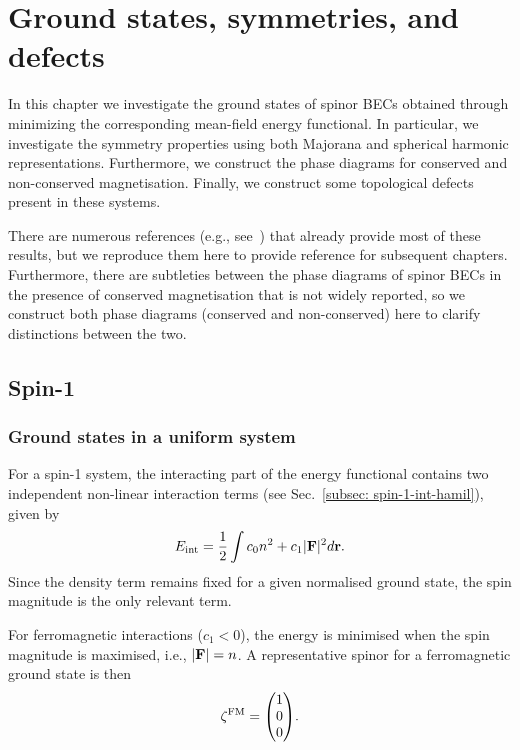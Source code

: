 \chapter{Ground states, symmetries, and defects}\label{chap: ground-states}
In this chapter we investigate the ground states of spinor BECs obtained through
minimizing the corresponding mean-field energy functional.
In particular, we investigate the symmetry properties using both Majorana and
spherical harmonic representations.
Furthermore, we construct the phase diagrams for conserved and non-conserved
magnetisation.
Finally, we construct some topological defects present in these systems.

There are numerous references (e.g., see~\cite{Ciobanu2000, Zhang2003,
    Kawaguchi2012, StamperKurn2013}) that already provide most of these results,
but we reproduce them here to provide reference for subsequent chapters.
Furthermore, there are subtleties between the phase diagrams of spinor BECs
in the presence of conserved magnetisation that is not widely reported, so we
construct both phase diagrams (conserved and non-conserved) here to clarify
distinctions between the two.


\section{Spin-1}\label{sec: ground-states-spin-1}

\subsection{Ground states in a uniform system}

For a spin-1 system, the interacting part of the energy functional contains
two independent non-linear interaction terms (see
Sec.~\ref{subsec: spin-1-int-hamil}), given by
\begin{equation}
    E_\mathrm{int} = \frac{1}{2}\int c_0n^2+c_1|\vb{F}|^2 d\vb{r}.
\end{equation}
Since the density term remains fixed for a given normalised ground state, the
spin magnitude is the only relevant term.

For ferromagnetic interactions (\(c_1 < 0 \)), the energy is minimised when
the spin magnitude is maximised, i.e., \(|\vb{F}| = n\).
A representative spinor for a ferromagnetic ground state is then
\begin{equation}
    \zeta^\mathrm{FM} = \mqty(1 \\ 0 \\ 0).
\end{equation}

